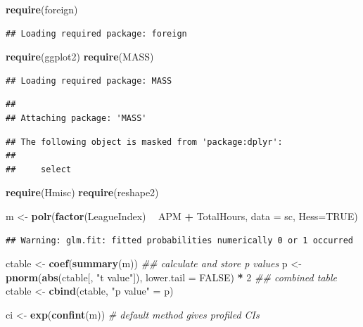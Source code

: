 \documentclass[]{article}
\newenvironment{Shaded}{\begin{snugshade}}{\end{snugshade}}
\newcommand{\CommentTok}[1]{\textcolor[rgb]{0.56,0.35,0.01}{\textit{#1}}}
\newcommand{\DataTypeTok}[1]{\textcolor[rgb]{0.13,0.29,0.53}{#1}}
\newcommand{\DecValTok}[1]{\textcolor[rgb]{0.00,0.00,0.81}{#1}}
\newcommand{\KeywordTok}[1]{\textcolor[rgb]{0.13,0.29,0.53}{\textbf{#1}}}
\newcommand{\NormalTok}[1]{#1}
\newcommand{\OperatorTok}[1]{\textcolor[rgb]{0.81,0.36,0.00}{\textbf{#1}}}
\newcommand{\OtherTok}[1]{\textcolor[rgb]{0.56,0.35,0.01}{#1}}
\newcommand{\StringTok}[1]{\textcolor[rgb]{0.31,0.60,0.02}{#1}}
\begin{document}
\begin{Shaded}
\begin{Highlighting}[]
\KeywordTok{require}\NormalTok{(foreign)}
\end{Highlighting}
\end{Shaded}

\begin{verbatim}
## Loading required package: foreign
\end{verbatim}

\begin{Shaded}
\begin{Highlighting}[]
\KeywordTok{require}\NormalTok{(ggplot2)}
\KeywordTok{require}\NormalTok{(MASS)}
\end{Highlighting}
\end{Shaded}

\begin{verbatim}
## Loading required package: MASS
\end{verbatim}

\begin{verbatim}
## 
## Attaching package: 'MASS'
\end{verbatim}

\begin{verbatim}
## The following object is masked from 'package:dplyr':
## 
##     select
\end{verbatim}

\begin{Shaded}
\begin{Highlighting}[]
\KeywordTok{require}\NormalTok{(Hmisc)}
\KeywordTok{require}\NormalTok{(reshape2)}

\NormalTok{m <-}\StringTok{ }\KeywordTok{polr}\NormalTok{(}\KeywordTok{factor}\NormalTok{(LeagueIndex) }\OperatorTok{~}\StringTok{ }\NormalTok{APM }\OperatorTok{+}\StringTok{ }\NormalTok{TotalHours, }\DataTypeTok{data =}\NormalTok{ sc, }\DataTypeTok{Hess=}\OtherTok{TRUE}\NormalTok{)}
\end{Highlighting}
\end{Shaded}

\begin{verbatim}
## Warning: glm.fit: fitted probabilities numerically 0 or 1 occurred
\end{verbatim}

\begin{Shaded}
\begin{Highlighting}[]
\NormalTok{ctable <-}\StringTok{ }\KeywordTok{coef}\NormalTok{(}\KeywordTok{summary}\NormalTok{(m))}
\CommentTok{## calculate and store p values}
\NormalTok{p <-}\StringTok{ }\KeywordTok{pnorm}\NormalTok{(}\KeywordTok{abs}\NormalTok{(ctable[, }\StringTok{"t value"}\NormalTok{]), }\DataTypeTok{lower.tail =} \OtherTok{FALSE}\NormalTok{) }\OperatorTok{*}\StringTok{ }\DecValTok{2}
\CommentTok{## combined table}
\NormalTok{ctable <-}\StringTok{ }\KeywordTok{cbind}\NormalTok{(ctable, }\StringTok{"p value"}\NormalTok{ =}\StringTok{ }\NormalTok{p)}

\NormalTok{ci <-}\StringTok{ }\KeywordTok{exp}\NormalTok{(}\KeywordTok{confint}\NormalTok{(m)) }\CommentTok{# default method gives profiled CIs}
\end{Highlighting}
\end{Shaded}
\end{document}
